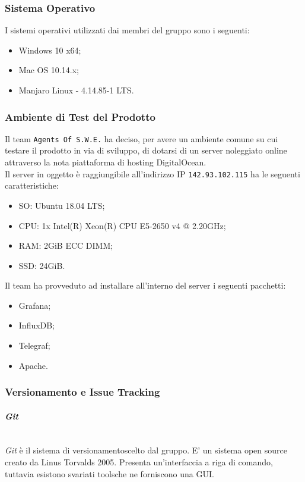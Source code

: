 \subsubsection{Sistema Operativo}
	I sistemi operativi utilizzati dai membri del gruppo sono i seguenti:
	\begin{itemize}
	\item Windows 10 x64;
	\item Mac OS 10.14.x;
	\item Manjaro Linux - 4.14.85-1 LTS.
	\end{itemize}

\subsubsection{Ambiente di Test del Prodotto}\label{Server}
Il team \texttt{Agents Of S.W.E.} ha deciso, per avere un ambiente comune su cui testare il prodotto in via di sviluppo, di dotarsi di un server noleggiato online attraverso la nota piattaforma di hosting DigitalOcean\glossario.\\
Il server in oggetto è raggiungibile all'indirizzo IP \texttt{142.93.102.115} ha le seguenti caratteristiche:
\begin{itemize}
	\item SO: Ubuntu 18.04 LTS;
	\item CPU: 1x Intel(R) Xeon(R) CPU E5-2650 v4 @ 2.20GHz;
	\item RAM: 2GiB ECC DIMM;
	\item SSD: 24GiB.
\end{itemize}
Il team ha provveduto ad installare all'interno del server i seguenti pacchetti:
\begin{itemize}
	\item Grafana;
	\item InfluxDB;
	\item Telegraf;
	\item Apache\glossario.
\end{itemize}

\subsubsection{Versionamento e Issue Tracking}

\paragraph{\textit{Git}} ~\\
	\textit{Git} è il sistema di versionamento\glossario scelto dal gruppo. E' un sistema open source creato da Linus 	Torvalds 2005. Presenta un'interfaccia a riga di comando, tuttavia esistono svariati tools\glossario 	che 	ne forniscono una GUI.

